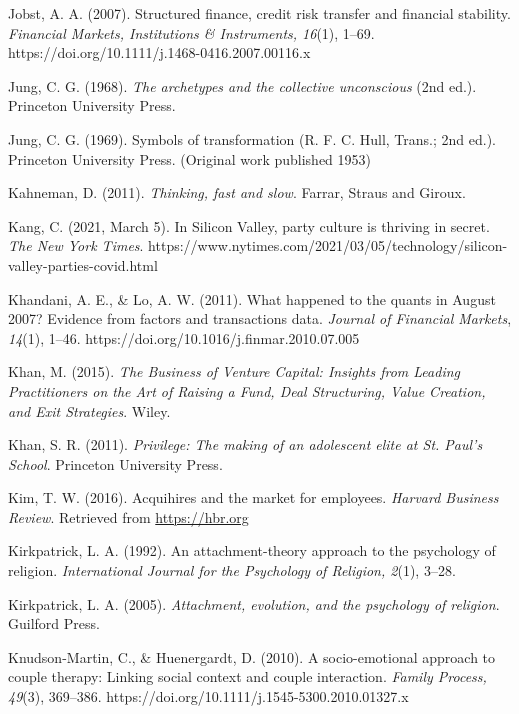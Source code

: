 \begin{thebibliography}{}
    Jobst, A. A. (2007). Structured finance, credit risk transfer and financial stability. \textit{Financial Markets, Institutions \& Instruments, 16}(1), 1–69. https://doi.org/10.1111/j.1468-0416.2007.00116.x

    Jung, C. G. (1968). \textit{The archetypes and the collective unconscious} (2nd ed.). Princeton University Press.

    Jung, C. G. (1969). Symbols of transformation (R. F. C. Hull, Trans.; 2nd ed.). Princeton University Press. (Original work published 1953)

    
    Kahneman, D. (2011). \textit{Thinking, fast and slow}. Farrar, Straus and Giroux.

    Kang, C. (2021, March 5). In Silicon Valley, party culture is thriving in secret. \textit{The New York Times}. https://www.nytimes.com/2021/03/05/technology/silicon-valley-parties-covid.html

    Khandani, A. E., \& Lo, A. W. (2011). What happened to the quants in August 2007? Evidence from factors and transactions data. \textit{Journal of Financial Markets}, \textit{14}(1), 1–46. https://doi.org/10.1016/j.finmar.2010.07.005
    
    Khan, M. (2015). \textit{The Business of Venture Capital: Insights from Leading Practitioners on the Art of Raising a Fund, Deal Structuring, Value Creation, and Exit Strategies}. Wiley.

    Khan, S. R. (2011). \textit{Privilege: The making of an adolescent elite at St. Paul's School}. Princeton University Press.

    Kim, T. W. (2016). Acquihires and the market for employees. \textit{Harvard Business Review}. Retrieved from \url{https://hbr.org}

    Kirkpatrick, L. A. (1992). An attachment-theory approach to the psychology of religion. \textit{International Journal for the Psychology of Religion, 2}(1), 3–28.

    Kirkpatrick, L. A. (2005). \textit{Attachment, evolution, and the psychology of religion}. Guilford Press.

    Knudson-Martin, C., \& Huenergardt, D. (2010). A socio-emotional approach to couple therapy: Linking social context and couple interaction. \textit{Family Process, 49}(3), 369–386. https://doi.org/10.1111/j.1545-5300.2010.01327.x


\end{thebibliography}
